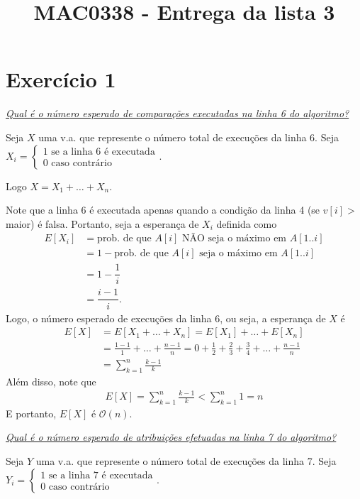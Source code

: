 \documentclass{article}
\title{MAC0338 - Entrega da lista 3}
\author{}
\date{}
\newcommand{\bigO}[1]{\ensuremath{\mathcal{O}(#1)}}
\begin{document}
\maketitle

\section*{Exercício 1}

\underline{\textit{Qual é o número esperado de comparações executadas na linha 6 do algoritmo?}}

Seja $X$ uma v.a. que represente o número total de execuções da linha 6.
Seja $X_i = \begin{cases*}1 \mbox{ se a linha 6 é executada}\\0 \mbox{ caso contrário}\end{cases*}$.

Logo $X = X_1 + \dots + X_n$.

Note que a linha 6 é executada apenas quando a condição da linha 4 (se $v[i] >$ maior) é falsa.
Portanto, seja a esperança de $X_i$ definida como
\begin{align*}
  E[X_i] &= \mbox{prob. de que } A[i] \mbox{ NÃO seja o máximo em } A[1..i] \\
  &= 1 - \mbox{prob. de que } A[i] \mbox{ seja o máximo em } A[1..i] \\
  &= 1 - \dfrac{1}{i} \\
  &= \dfrac{i-1}{i}.
\end{align*}
Logo, o número esperado de execuções da linha 6, ou seja, a esperança de $X$ é
\begin{align*}
  E[X] &= E[X_1 + \dots + X_n] = E[X_1] + \dots + E[X_n] \\
  &= \frac{1-1}{1} + \dots + \frac{n-1}{n} = 0 + \frac{1}{2} + \frac{2}{3} + \frac{3}{4} + \dots + \frac{n-1}{n} \\
  &= \sum_{k=1}^{n} \frac{k-1}{k}
\end{align*}
Além disso, note que
\begin{align*}
  E[X] = \sum_{k=1}^{n} \frac{k-1}{k} < \sum_{k=1}^{n} 1 = n
\end{align*}
E portanto, $E[X]$ é $\bigO{n}$.

\bigskip

\underline{\textit{Qual é o número esperado de atribuições efetuadas na linha 7 do algoritmo?}}

Seja $Y$ uma v.a. que represente o número total de execuções da linha 7.
Seja $Y_i = \begin{cases*}1 \mbox{ se a linha 7 é executada}\\0 \mbox{ caso contrário}\end{cases*}$.
\end{document}
